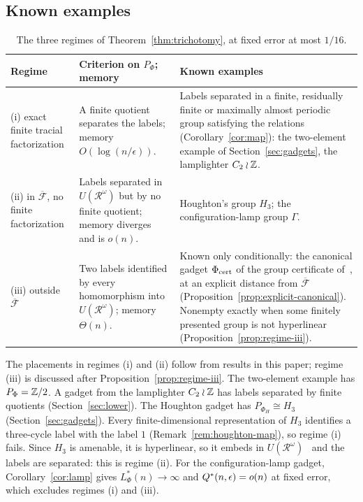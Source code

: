 \subsection{Known examples}

\begin{table}[ht]
\centering\small
\begin{tabularx}{\textwidth}{@{}>{\raggedright\arraybackslash}p{}>{\raggedright\arraybackslash}X>{\raggedright\arraybackslash}X@{}}
\toprule
Regime & Criterion on $P_\Phi$; memory & Known examples\\
\midrule
(i) exact finite tracial factorization
 & A finite quotient separates the labels; memory $O(\log(n/\epsilon))$.
 & Labels separated in a finite, residually finite or maximally almost periodic group satisfying the
   relations (Corollary~\ref{cor:map}): the two-element example of Section~\ref{sec:gadgets}, the
   lamplighter $C_2\wr\mathbb Z$.\\
\addlinespace
(ii) in $\overline{\mathcal F}$, no finite factorization
 & Labels separated in $U(\mathcal R^\omega)$ but by no finite quotient; memory diverges and is $o(n)$.
 & Houghton's group $H_3$; the configuration-lamp group $\Gamma$.\\
\addlinespace
(iii) outside $\overline{\mathcal F}$
 & Two labels identified by every homomorphism into $U(\mathcal R^\omega)$; memory $\Theta(n)$.
 & Known only conditionally: the canonical gadget $\Phi_{\rm cert}$ of the group certificate
   of~\cite{MghirbiDouglasD}, at an explicit distance from $\overline{\mathcal F}$
   (Proposition~\ref{prop:explicit-canonical}). Nonempty exactly when some finitely presented group
   is not hyperlinear (Proposition~\ref{prop:regime-iii}).\\
\bottomrule
\end{tabularx}
\caption{The three regimes of Theorem~\ref{thm:trichotomy}, at fixed error at most $1/16$.}\label{tab:regimes}
\end{table}

The placements in regimes (i) and (ii) follow from results in this paper; regime (iii) is
discussed after Proposition~\ref{prop:regime-iii}. The two-element example
has $P_\Phi=\mathbb Z/2$. A gadget from the lamplighter $C_2\wr\mathbb Z$ has labels separated by finite quotients
(Section~\ref{sec:lower}). The Houghton gadget has $P_{\Phi_H}\cong H_3$ (Section~\ref{sec:gadgets}).
Every finite-dimensional representation of $H_3$ identifies a three-cycle label with the label $1$
(Remark~\ref{rem:houghton-map}), so regime (i) fails. Since $H_3$ is amenable, it is hyperlinear, so it
embeds in $U(\mathcal R^\omega)$~\cite{Pestov2008} and the labels are separated: this is regime (ii).
For the configuration-lamp gadget, Corollary~\ref{cor:lamp} gives $L^*_\Phi(n)\to\infty$ and
$Q^{*}(n,\epsilon)=o(n)$ at fixed error, which excludes regimes (i) and (iii).

